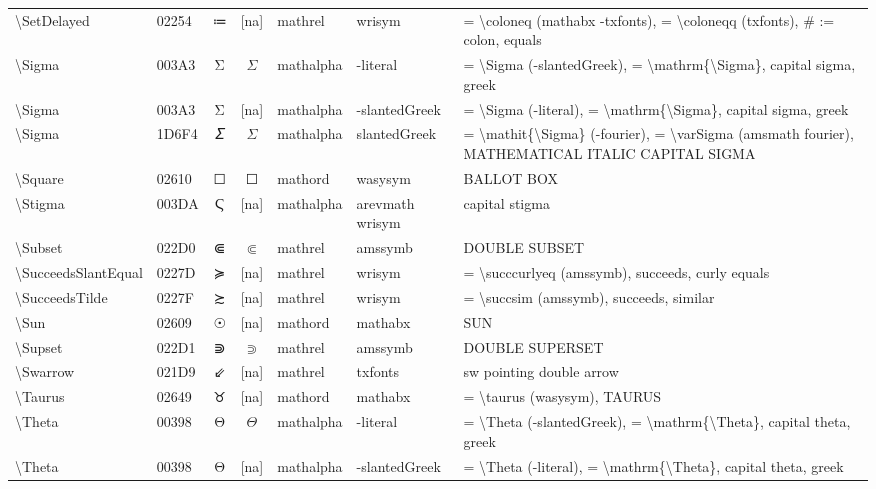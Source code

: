 \documentclass[a4paper,landscape]{article}
\begin{document}
\begin{longtable}{llcclll}
\textbackslash{}SetDelayed & 02254 & ≔ & [na] & mathrel & wrisym & = \textbackslash{}coloneq (mathabx -txfonts), = \textbackslash{}coloneqq (txfonts),  \# := colon,  equals \\
\textbackslash{}Sigma & 003A3 & Σ & $\Sigma$ & mathalpha & -literal & = \textbackslash{}Sigma (-slantedGreek), = \textbackslash{}mathrm\{\textbackslash{}Sigma\}, capital sigma, greek \\
\textbackslash{}Sigma & 003A3 & Σ & [na] & mathalpha & -slantedGreek & = \textbackslash{}Sigma (-literal),  = \textbackslash{}mathrm\{\textbackslash{}Sigma\},  capital sigma,  greek \\
\textbackslash{}Sigma & 1D6F4 & 𝛴 & $\Sigma$ & mathalpha & slantedGreek & = \textbackslash{}mathit\{\textbackslash{}Sigma\} (-fourier), = \textbackslash{}varSigma (amsmath fourier), MATHEMATICAL ITALIC CAPITAL SIGMA \\
\textbackslash{}Square & 02610 & \textsf ☐ & $\Square$ & mathord & wasysym & BALLOT BOX \\
\textbackslash{}Stigma & 003DA & Ϛ & [na] & mathalpha & arevmath wrisym & capital stigma \\
\textbackslash{}Subset & 022D0 & ⋐ & $\Subset$ & mathrel & amssymb & DOUBLE SUBSET \\
\textbackslash{}SucceedsSlantEqual & 0227D & ≽ & [na] & mathrel & wrisym & = \textbackslash{}succcurlyeq (amssymb),  succeeds,  curly equals \\
\textbackslash{}SucceedsTilde & 0227F & ≿ & [na] & mathrel & wrisym & = \textbackslash{}succsim (amssymb),  succeeds,  similar \\
\textbackslash{}Sun & 02609 & ☉ & [na] & mathord & mathabx & SUN \\
\textbackslash{}Supset & 022D1 & ⋑ & $\Supset$ & mathrel & amssymb & DOUBLE SUPERSET \\
\textbackslash{}Swarrow & 021D9 & ⇙ & [na] & mathrel & txfonts & sw pointing double arrow \\
\textbackslash{}Taurus & 02649 & \textsf ♉ & [na] & mathord & mathabx & = \textbackslash{}taurus (wasysym),  TAURUS \\
\textbackslash{}Theta & 00398 & Θ & $\Theta$ & mathalpha & -literal & = \textbackslash{}Theta (-slantedGreek), = \textbackslash{}mathrm\{\textbackslash{}Theta\}, capital theta, greek \\
\textbackslash{}Theta & 00398 & Θ & [na] & mathalpha & -slantedGreek & = \textbackslash{}Theta (-literal),  = \textbackslash{}mathrm\{\textbackslash{}Theta\},  capital theta,  greek \\

\end{longtable}
\end{document}
